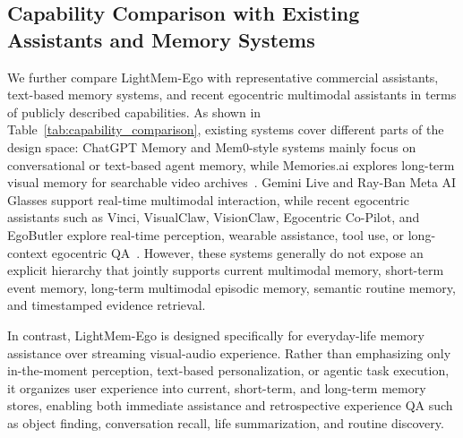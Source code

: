 

\subsection{Capability Comparison with Existing Assistants and Memory Systems}
We further compare LightMem-Ego with representative commercial assistants, text-based memory systems, and recent egocentric multimodal assistants in terms of publicly described capabilities. 
As shown in Table~\ref{tab:capability_comparison}, existing systems cover different parts of the design space: ChatGPT Memory and Mem0-style systems mainly focus on conversational or text-based agent memory, while Memories.ai explores long-term visual memory for searchable video archives~\cite{GPT-4o, GPT-5, Mem0, MemoriesAI}. Gemini Live and Ray-Ban Meta AI Glasses support real-time multimodal interaction, while recent egocentric assistants such as Vinci, VisualClaw, VisionClaw, Egocentric Co-Pilot, and EgoButler explore real-time perception, wearable assistance, tool use, or long-context egocentric QA~\cite{Vinci, VisualClaw, VisionClaw, Egocentric_Co-Pilot, EgoLife}.
However, these systems generally do not expose an explicit hierarchy that jointly supports current multimodal memory, short-term event memory, long-term multimodal episodic memory, semantic routine memory, and timestamped evidence retrieval.

In contrast, LightMem-Ego is designed specifically for everyday-life memory assistance over streaming visual-audio experience.
Rather than emphasizing only in-the-moment perception, text-based personalization, or agentic task execution, it organizes user experience into current, short-term, and long-term memory stores, enabling both immediate assistance and retrospective experience QA such as object finding, conversation recall, life summarization, and routine discovery.
